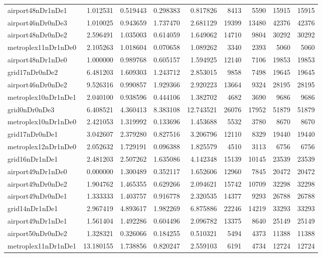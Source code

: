 \begin{longtable}{|l|r|r|r|r|r|r|r|r|}
airport48nDr1nDe1 & 1.012531 & 0.519443 & 0.298383 & 0.817826 & 8413 & 5590 & 15915 & 15915 \\
airport46nDr0nDe3 & 1.010025 & 0.943659 & 1.737470 & 2.681129 & 19399 & 13480 & 42376 & 42376 \\
airport48nDr0nDe2 & 2.596491 & 1.035003 & 0.614059 & 1.649062 & 14710 & 9804 & 30292 & 30292 \\
metroplex11nDr1nDe0 & 2.105263 & 1.018604 & 0.070658 & 1.089262 & 3340 & 2393 & 5060 & 5060 \\
airport48nDr1nDe0 & 1.000000 & 0.989768 & 0.605157 & 1.594925 & 12140 & 7106 & 19853 & 19853 \\
grid17nDr0nDe2 & 6.481203 & 1.609303 & 1.243712 & 2.853015 & 9858 & 7498 & 19645 & 19645 \\
airport46nDr0nDe2 & 9.526316 & 0.990857 & 1.929366 & 2.920223 & 13664 & 9324 & 28195 & 28195 \\
metroplex10nDr1nDe1 & 2.040100 & 0.938596 & 0.444106 & 1.382702 & 4682 & 3690 & 9686 & 9686 \\
grid0nDr0nDe3 & 6.408521 & 4.360413 & 8.383108 & 12.743521 & 26076 & 17952 & 51879 & 51879 \\
metroplex10nDr1nDe0 & 2.421053 & 1.319992 & 0.133696 & 1.453688 & 5532 & 3780 & 8670 & 8670 \\
grid17nDr0nDe1 & 3.042607 & 2.379280 & 0.827516 & 3.206796 & 12110 & 8329 & 19440 & 19440 \\
metroplex12nDr1nDe0 & 2.052632 & 1.729191 & 0.096388 & 1.825579 & 4510 & 3113 & 6756 & 6756 \\
grid16nDr1nDe1 & 2.481203 & 2.507262 & 1.635086 & 4.142348 & 15139 & 10145 & 23539 & 23539 \\
airport49nDr1nDe0 & 0.000000 & 1.300489 & 0.352117 & 1.652606 & 12960 & 7845 & 20472 & 20472 \\
airport49nDr0nDe2 & 1.904762 & 1.465355 & 0.629266 & 2.094621 & 15742 & 10709 & 32298 & 32298 \\
airport49nDr0nDe1 & 1.333333 & 1.403757 & 0.916778 & 2.320535 & 14377 & 9293 & 26788 & 26788 \\
grid14nDr1nDe1 & 2.967419 & 4.893617 & 1.982269 & 6.875886 & 22246 & 14219 & 33293 & 33293 \\
airport49nDr1nDe1 & 1.561404 & 1.492286 & 0.604496 & 2.096782 & 13375 & 8640 & 25149 & 25149 \\
airport50nDr0nDe2 & 1.328321 & 0.326066 & 0.184255 & 0.510321 & 5494 & 4373 & 11388 & 11388 \\
metroplex11nDr1nDe1 & 13.180155 & 1.738856 & 0.820247 & 2.559103 & 6191 & 4734 & 12724 & 12724 \\

\end{longtable}
